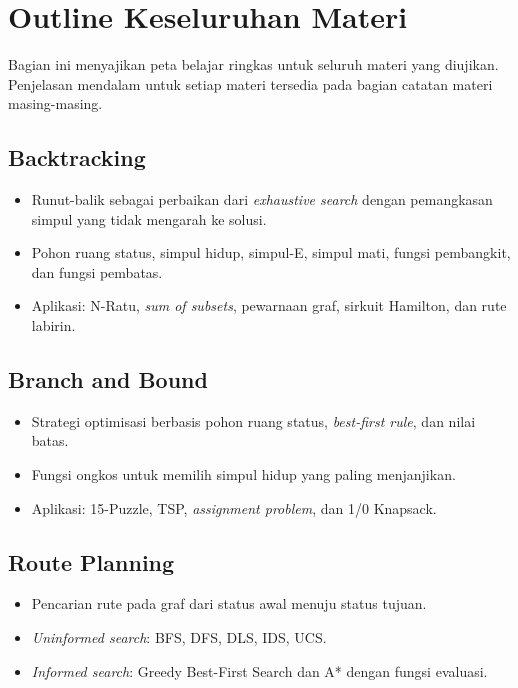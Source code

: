 \documentclass[11pt,a4paper]{article}
\begin{document}
\section{Outline Keseluruhan Materi}

Bagian ini menyajikan peta belajar ringkas untuk seluruh materi yang
diujikan. Penjelasan mendalam untuk setiap materi tersedia pada
bagian catatan materi masing-masing.

\subsection{Backtracking}
\begin{itemize}
    \item Runut-balik sebagai perbaikan dari \textit{exhaustive
        search} dengan pemangkasan simpul yang tidak mengarah ke solusi.
    \item Pohon ruang status, simpul hidup, simpul-E, simpul mati,
        fungsi pembangkit, dan fungsi pembatas.
    \item Aplikasi: N-Ratu, \textit{sum of subsets}, pewarnaan graf,
        sirkuit Hamilton, dan rute labirin.
\end{itemize}

\subsection{Branch and Bound}
\begin{itemize}
    \item Strategi optimisasi berbasis pohon ruang status,
        \textit{best-first rule}, dan nilai batas.
    \item Fungsi ongkos untuk memilih simpul hidup yang paling menjanjikan.
    \item Aplikasi: 15-Puzzle, TSP, \textit{assignment problem}, dan
        1/0 Knapsack.
\end{itemize}

\subsection{Route Planning}
\begin{itemize}
    \item Pencarian rute pada graf dari status awal menuju status tujuan.
    \item \textit{Uninformed search}: BFS, DFS, DLS, IDS, UCS.
    \item \textit{Informed search}: Greedy Best-First Search dan A*
        dengan fungsi evaluasi.
\end{itemize}
\end{document}
